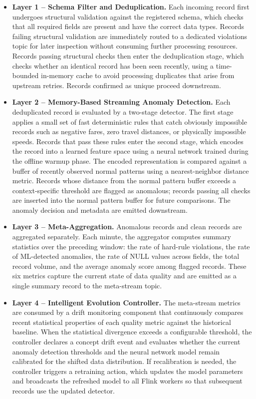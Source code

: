 \begin{itemize}
    \item \textbf{Layer 1 -- Schema Filter and Deduplication.} Each incoming record first undergoes structural validation against the registered schema, which checks that all required fields are present and have the correct data types. Records failing structural validation are immediately routed to a dedicated violations topic for later inspection without consuming further processing resources. Records passing structural checks then enter the deduplication stage, which checks whether an identical record has been seen recently, using a time-bounded in-memory cache to avoid processing duplicates that arise from upstream retries. Records confirmed as unique proceed downstream.

    \item \textbf{Layer 2 -- Memory-Based Streaming Anomaly Detection.} Each deduplicated record is evaluated by a two-stage detector. The first stage applies a small set of fast deterministic rules that catch obviously impossible records such as negative fares, zero travel distances, or physically impossible speeds. Records that pass these rules enter the second stage, which encodes the record into a learned feature space using a neural network trained during the offline warmup phase. The encoded representation is compared against a buffer of recently observed normal patterns using a nearest-neighbor distance metric. Records whose distance from the normal pattern buffer exceeds a context-specific threshold are flagged as anomalous; records passing all checks are inserted into the normal pattern buffer for future comparisons. The anomaly decision and metadata are emitted downstream.

    \item \textbf{Layer 3 -- Meta-Aggregation.} Anomalous records and clean records are aggregated separately. Each minute, the aggregator computes summary statistics over the preceding window: the rate of hard-rule violations, the rate of ML-detected anomalies, the rate of NULL values across fields, the total record volume, and the average anomaly score among flagged records. These six metrics capture the current state of data quality and are emitted as a single summary record to the meta-stream topic.

    \item \textbf{Layer 4 -- Intelligent Evolution Controller.} The meta-stream metrics are consumed by a drift monitoring component that continuously compares recent statistical properties of each quality metric against the historical baseline. When the statistical divergence exceeds a configurable threshold, the controller declares a concept drift event and evaluates whether the current anomaly detection thresholds and the neural network model remain calibrated for the shifted data distribution. If recalibration is needed, the controller triggers a retraining action, which updates the model parameters and broadcasts the refreshed model to all Flink workers so that subsequent records use the updated detector.
\end{itemize}

